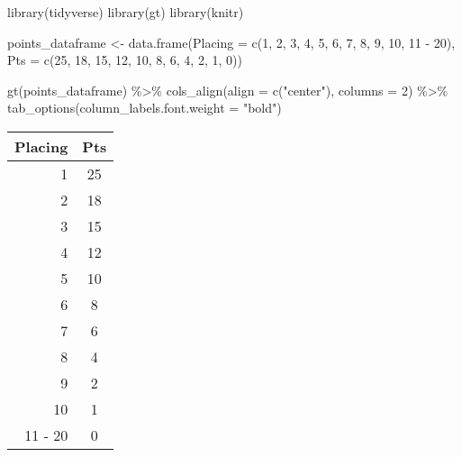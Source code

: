 \documentclass[
]{book}
\newenvironment{Shaded}{\begin{snugshade}}{\end{snugshade}}
\newcommand{\AttributeTok}[1]{\textcolor[rgb]{0.77,0.63,0.00}{#1}}
\newcommand{\DecValTok}[1]{\textcolor[rgb]{0.00,0.00,0.81}{#1}}
\newcommand{\FunctionTok}[1]{\textcolor[rgb]{0.00,0.00,0.00}{#1}}
\newcommand{\NormalTok}[1]{#1}
\newcommand{\OtherTok}[1]{\textcolor[rgb]{0.56,0.35,0.01}{#1}}
\newcommand{\SpecialCharTok}[1]{\textcolor[rgb]{0.00,0.00,0.00}{#1}}
\newcommand{\StringTok}[1]{\textcolor[rgb]{0.31,0.60,0.02}{#1}}
\begin{document}
\begin{Shaded}
\begin{Highlighting}[]
\FunctionTok{library}\NormalTok{(tidyverse)}
\FunctionTok{library}\NormalTok{(gt)}
\FunctionTok{library}\NormalTok{(knitr)}

\NormalTok{points\_dataframe }\OtherTok{\textless{}{-}} \FunctionTok{data.frame}\NormalTok{(}\AttributeTok{Placing =} \FunctionTok{c}\NormalTok{(}\StringTok{\textquotesingle{}1\textquotesingle{}}\NormalTok{, }\StringTok{\textquotesingle{}2\textquotesingle{}}\NormalTok{, }\StringTok{\textquotesingle{}3\textquotesingle{}}\NormalTok{, }\StringTok{\textquotesingle{}4\textquotesingle{}}\NormalTok{, }\StringTok{\textquotesingle{}5\textquotesingle{}}\NormalTok{, }\StringTok{\textquotesingle{}6\textquotesingle{}}\NormalTok{, }\StringTok{\textquotesingle{}7\textquotesingle{}}\NormalTok{, }\StringTok{\textquotesingle{}8\textquotesingle{}}\NormalTok{, }\StringTok{\textquotesingle{}9\textquotesingle{}}\NormalTok{, }\StringTok{\textquotesingle{}10\textquotesingle{}}\NormalTok{, }\StringTok{\textquotesingle{}11 {-} 20\textquotesingle{}}\NormalTok{),}
           \AttributeTok{Pts =} \FunctionTok{c}\NormalTok{(}\DecValTok{25}\NormalTok{, }\DecValTok{18}\NormalTok{, }\DecValTok{15}\NormalTok{, }\DecValTok{12}\NormalTok{, }\DecValTok{10}\NormalTok{, }\DecValTok{8}\NormalTok{, }\DecValTok{6}\NormalTok{, }\DecValTok{4}\NormalTok{, }\DecValTok{2}\NormalTok{, }\DecValTok{1}\NormalTok{, }\DecValTok{0}\NormalTok{))}

\FunctionTok{gt}\NormalTok{(points\_dataframe)  }\SpecialCharTok{\%\textgreater{}\%} 
  \FunctionTok{cols\_align}\NormalTok{(}\AttributeTok{align =} \FunctionTok{c}\NormalTok{(}\StringTok{"center"}\NormalTok{), }\AttributeTok{columns =} \DecValTok{2}\NormalTok{) }\SpecialCharTok{\%\textgreater{}\%} 
  \FunctionTok{tab\_options}\NormalTok{(}\AttributeTok{column\_labels.font.weight =} \StringTok{"bold"}\NormalTok{)}
\end{Highlighting}
\end{Shaded}

\begin{longtable}{rc}
\toprule
Placing & Pts \\ 
\midrule
1 & 25 \\ 
2 & 18 \\ 
3 & 15 \\ 
4 & 12 \\ 
5 & 10 \\ 
6 & 8 \\ 
7 & 6 \\ 
8 & 4 \\ 
9 & 2 \\ 
10 & 1 \\ 
11 - 20 & 0 \\ 
\bottomrule
\end{longtable}
\end{document}
